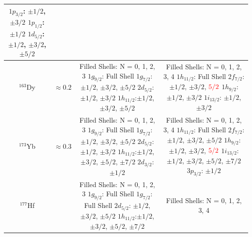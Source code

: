 \documentclass[8pt,a4paper, twoside]{report}
\begin{document}
\begin{table}[htbp]
\begin{adjustwidth}{-3cm}{-3cm}
\begin{tabular}{|c|c|c|c|}
{    $1p_{3/2}$: $\pm 1/2$, $\pm 3/2$ \\
    $1p_{1/2}$: $\pm 1/2$ \\
    $1d_{5/2}$: $\pm 1/2$, $\pm 3/2$, $\pm 5/2$}\\
\midrule
$^{163}$Dy & $\approx 0.2$ 
    &  \pbox{20cm}{Filled Shells: N = 0, 1, 2, 3 \\
    $1g_{9/2}$: Full Shell \\
    $1g_{7/2}$: $\pm 1/2$, $\pm 3/2$, $\pm 5/2$ \\
    $2d_{5/2}$: $\pm 1/2$, $\pm 3/2$ \\
    $1h_{11/2}$:$\pm 1/2$, $\pm 3/2$, $\pm 5/2$}              
    &  \pbox{20cm}{Filled Shells: N = 0, 1, 2, 3, 4 \\
    $1h_{11/2}$: Full Shell \\
    $2f_{7/2}$: $\pm 1/2$, $\pm 3/2$, $\textcolor{red}{5/2}$ \\
    $1h_{9/2}$: $\pm 1/2$, $\pm 3/2$ \\
    $1i_{13/2}$: $\pm 1/2$, $\pm 3/2$} \\
\midrule
$^{173}$Yb & $\approx 0.3$
    &  \pbox{20cm}{Filled Shells: N = 0, 1, 2, 3 \\
    $1g_{9/2}$: Full Shell \\
    $1g_{7/2}$: $\pm 1/2$, $\pm 3/2$, $\pm 5/2$ \\
    $2d_{5/2}$: $\pm 1/2$, $\pm 3/2$ \\
    $1h_{11/2}$:$\pm 1/2$, $\pm 3/2$, $\pm 5/2$, $\pm 7/2$ \\
    $2d_{3/2}$: $\pm 1/2$}              
    &  \pbox{20cm}{Filled Shells: N = 0, 1, 2, 3, 4 \\
    $1h_{11/2}$: Full Shell \\
    $2f_{7/2}$: $\pm 1/2$, $\pm 3/2$, $\pm 5/2$ \\
    $1h_{9/2}$: $\pm 1/2$, $\pm 3/2$, $\textcolor{red}{5/2}$ \\
    $1i_{13/2}$:$\pm 1/2$, $\pm 3/2$, $\pm 5/2$, $\pm 7/2$ \\
    $3p_{3/2}$: $\pm 1/2$} \\
\midrule
$^{177}$Hf &
    &  \pbox{20cm}{Filled Shells: N = 0, 1, 2, 3 \\
    $1g_{9/2}$: Full Shell \\
    $1g_{7/2}$: Full Shell \\
    $2d_{5/2}$: $\pm 1/2$, $\pm 3/2$, $\pm 5/2$ \\
    $1h_{11/2}$:$\pm 1/2$, $\pm 3/2$, $\pm 5/2$, $\pm 7/2$}              
    &  \pbox{20cm}{Filled Shells: N = 0, 1, 2, 3, 4 \\
}
\end{tabular}
\end{adjustwidth}
\end{table}
\end{document}
